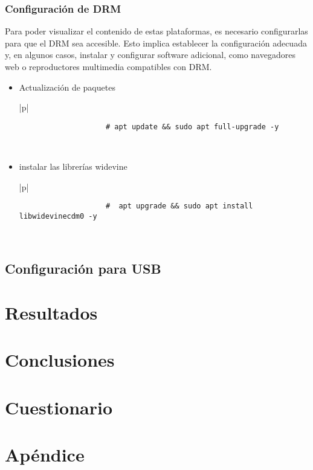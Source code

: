 \documentclass[report,12pt]{article}
\begin{document}
	\subsubsection{Configuración de DRM}
	Para poder visualizar el contenido de estas plataformas, es necesario configurarlas para que el DRM sea accesible. Esto implica establecer la configuración adecuada y, en algunos casos, instalar y configurar software adicional, como navegadores web o reproductores multimedia compatibles con DRM. \cite{raspberryparanovatos}
	
	\newpage
	\begin{itemize}
		\item Actualización de paquetes\par  
			\vspace{-1cm}
		\begin{table}[h]
			\centering
			\small %
			\color{gray} %
			\begin{tabular}{|p{\linewidth}|}
				\hline
				\begin{verbatim}
					# apt update && sudo apt full-upgrade -y
				\end{verbatim}
				\\
				\hline
			\end{tabular}
		\end{table}
			 \vspace{-1cm}
		\item instalar las librerías widevine \par 
			\vspace{-1cm}
		\begin{table}[h]
			\centering
			\small %
			\color{gray} %
			\begin{tabular}{|p{\linewidth}|}
				\hline
				\begin{verbatim}
					#  apt upgrade && sudo apt install libwidevinecdm0 -y
				\end{verbatim}
				\\
				\hline
			\end{tabular}
		\end{table}
	\end{itemize}
	
	\subsection{Configuración para USB}

	\section{Resultados}
	\section{Conclusiones}
	\section{Cuestionario}

	
	
	
	
	
	\section{Apéndice}
\end{document}
